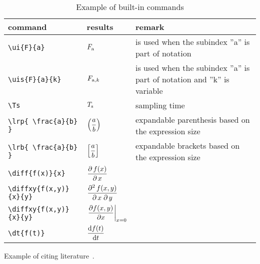 \begin{table}[h]
	\centering
	\caption{Example of built-in commands}
	\label{tab:commands}
	\begin{tabular}{llp{5cm}}
		\toprule
			command & results & remark\\
		\midrule
		  \texttt{\textbackslash{ui\{F\}\{a\}}} &  $F _{\text{a}}$ & is used 
		  when the subindex ''a'' is part 
		  of notation\\
		  \texttt{\textbackslash{uis\{F\}\{a\}\{k\}}} &  $F _{\text{a}, k}$ & is 
		  used  when  the  subindex ''a'' is  part  of notation and ''k'' is 
		  variable 
		  \\
		  \texttt{\textbackslash{Ts}} & $T _{\text{s}}$ & sampling time \\[2pt]
		  \texttt{\textbackslash{lrp\{ \textbackslash{frac\{a\}\{b\}} \}}} & 
		  $\displaystyle\left( \frac{a}{b} \right)$& 
		  expandable parenthesis based on 
		  the expression size\\
		  \texttt{\textbackslash{lrb\{ \textbackslash{frac\{a\}\{b\}} \}}} & 
		  $\displaystyle\left[ \frac{a}{b} \right]$& 
		  expandable brackets based on 
		  the expression size\\
		  \texttt{\textbackslash{diff\{f(x)\}\{x\}}} & 
		  $\displaystyle\frac{\partial\, f(x)}{\partial\, x}$& \\[10pt]
		  \texttt{\textbackslash{diffxy\{f(x,y)\}\{x\}\{y\}}} & 
		  $\displaystyle\frac{\partial^2\, f(x, y)}{\partial\, x\; \partial\, y}$& \\[10pt]
		  \texttt{\textbackslash{diffxy\{f(x,y)\}\{x\}\{y\}}} & 
		  $\displaystyle\left.\frac{\partial f(x, y)}{\partial x}\right\vert_{x=0}$& \\[10pt]
		  \texttt{\textbackslash{dt\{f(t)\} } } & $\displaystyle\frac{\mathrm{d}f(t)}{\mathrm{d}t}$  & \\
		\bottomrule
	\end{tabular}
\end{table}

Example of citing literature~\cite{boyd:book:2009:cvx}.